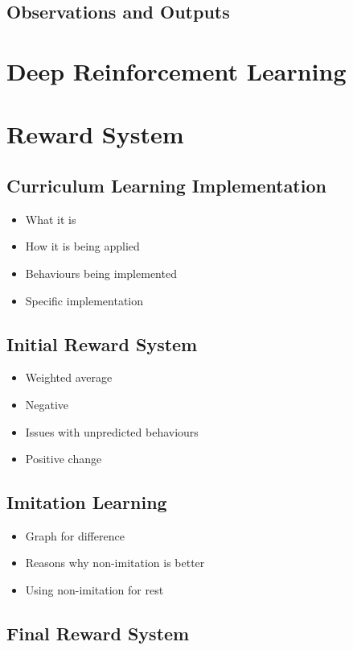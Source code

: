 \documentclass{article}
\begin{document}
\subsection{Observations and Outputs}
\lipsum[2][1]

\section{Deep Reinforcement Learning}
\lipsum[2][1]

\section{Reward System}
\lipsum[2][1]

\subsection{Curriculum Learning Implementation}
\begin{itemize}
    \item What it is
    \item How it is being applied
    \item Behaviours being implemented
    \item Specific implementation
\end{itemize}

\subsection{Initial Reward System}
\begin{itemize}
    \item Weighted average
    \item Negative
    \item Issues with unpredicted behaviours
    \item Positive change
\end{itemize}

\subsection{Imitation Learning}
\begin{itemize}
    \item Graph for difference
    \item Reasons why non-imitation is better
    \item Using non-imitation for rest
\end{itemize}

\subsection{Final Reward System}
\lipsum[2][1]
\end{document}
